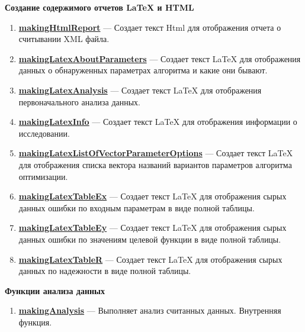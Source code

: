 \textbf{Создание содержимого отчетов LaTeX и HTML}
\begin{enumerate}

\item \textbf{\hyperref[makingHtmlReport]{makingHtmlReport}} --- Создает текст Html для отображения отчета о считывании XML файла.

\item \textbf{\hyperref[makingLatexAboutParameters]{makingLatexAboutParameters}} --- Создает текст LaTeX для отображения данных о обнаруженных параметрах алгоритма и какие они бывают.

\item \textbf{\hyperref[makingLatexAnalysis]{makingLatexAnalysis}} --- Создает текст LaTeX для отображения первоначального анализа данных.

\item \textbf{\hyperref[makingLatexInfo]{makingLatexInfo}} --- Создает текст LaTeX для отображения информации о исследовании.

\item \textbf{\hyperref[makingLatexListOfVectorParameterOptions]{makingLatexListOfVectorParameterOptions}} --- Создает текст LaTeX для отображения списка вектора названий вариантов параметров алгоритма оптимизации.

\item \textbf{\hyperref[makingLatexTableEx]{makingLatexTableEx}} --- Создает текст LaTeX для отображения сырых данных ошибки по входным параметрам в виде полной таблицы.

\item \textbf{\hyperref[makingLatexTableEy]{makingLatexTableEy}} --- Создает текст LaTeX для отображения сырых данных ошибки по значениям целевой функции в виде полной таблицы.

\item \textbf{\hyperref[makingLatexTableR]{makingLatexTableR}} --- Создает текст LaTeX для отображения сырых данных по надежности в виде полной таблицы.

\end{enumerate}

\textbf{Функции анализа данных}
\begin{enumerate}

\item \textbf{\hyperref[makingAnalysis]{makingAnalysis}} --- Выполняет анализ считанных данных. Внутренняя функция.

\end{enumerate}

